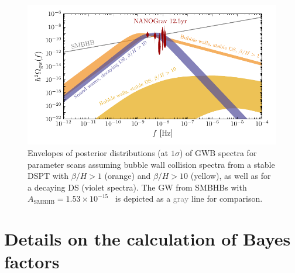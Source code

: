 	\begin{figure}[t]
		\centering
		\includegraphics[width = \textwidth]{thesisplots/ptbbn/ptbbn_6}
		\caption{Envelopes of posterior distributions (at $1\sigma$) of \ac{GWB} spectra for parameter scans assuming bubble wall collision spectra from a stable \ac{DSPT} with $\beta/H>1$ (\textcolor{DESYorange}{orange}) and $\beta/H>10$ (\textcolor{DESYgelb}{yellow}), as well as for a decaying \ac{DS} (\textcolor{DESYlila}{violet} spectra). The \ac{GW} from \acp{SMBHB} with $A_\text{SMBHB} = 1.53 \times 10^{-15}$~\cite{NANOGrav:2020bcs} is depicted as a \textcolor{gray}{gray} line for comparison.}
		\label{fig:spec-comparison}
	\end{figure}
	
	\section{Details on the calculation of Bayes factors}
	
